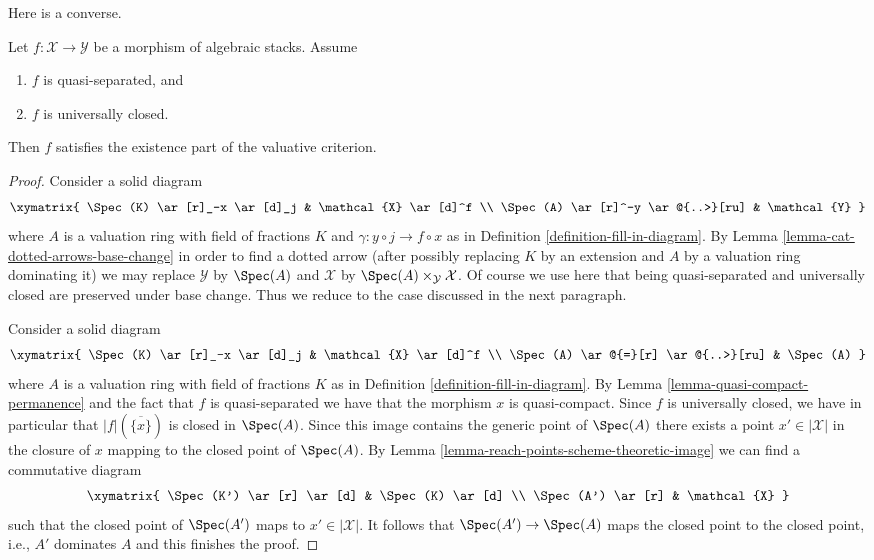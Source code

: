 \noindent
Here is a converse.

\begin{lemma}
\label{lemma-converse-existence-universally-closed}
Let $f : \mathcal{X} \to \mathcal{Y}$ be a morphism of algebraic stacks.
Assume
\begin{enumerate}
\item $f$ is quasi-separated, and
\item $f$ is universally closed.
\end{enumerate}
Then $f$ satisfies the existence part of the valuative criterion.
\end{lemma}

\begin{proof}
Consider a solid diagram
$$
\xymatrix{
\Spec(K) \ar[r]_-x \ar[d]_j & \mathcal{X} \ar[d]^f \\
\Spec(A) \ar[r]^-y \ar@{..>}[ru] & \mathcal{Y}
}
$$
where $A$ is a valuation ring with field of fractions $K$
and $\gamma : y \circ j \longrightarrow f \circ x$ as in
Definition \ref{definition-fill-in-diagram}. By
Lemma \ref{lemma-cat-dotted-arrows-base-change}
in order to find a dotted arrow (after possibly replacing
$K$ by an extension and $A$ by a valuation ring dominating it)
we may replace $\mathcal{Y}$ by $\Spec(A)$ and $\mathcal{X}$
by $\Spec(A) \times_\mathcal{Y} \mathcal{X}$. Of course
we use here that being
quasi-separated and universally closed are preserved under base change.
Thus we reduce to the case discussed in the next paragraph.

\medskip\noindent
Consider a solid diagram
$$
\xymatrix{
\Spec(K) \ar[r]_-x \ar[d]_j & \mathcal{X} \ar[d]^f \\
\Spec(A) \ar@{=}[r] \ar@{..>}[ru] & \Spec(A)
}
$$
where $A$ is a valuation ring with field of fractions $K$ as in
Definition \ref{definition-fill-in-diagram}.
By Lemma \ref{lemma-quasi-compact-permanence} and the fact
that $f$ is quasi-separated we have that
the morphism $x$ is quasi-compact.
Since $f$ is universally closed, we have in particular
that $|f|(\overline{\{x\}})$ is closed in $\Spec(A)$.
Since this image contains the generic point of $\Spec(A)$
there exists a point $x' \in |\mathcal{X}|$ in the closure
of $x$ mapping to the closed point of $\Spec(A)$.
By Lemma \ref{lemma-reach-points-scheme-theoretic-image}
we can find a commutative diagram
$$
\xymatrix{
\Spec(K') \ar[r] \ar[d] & \Spec(K) \ar[d] \\
\Spec(A') \ar[r] & \mathcal{X}
}
$$
such that the closed point of $\Spec(A')$ maps to $x' \in |\mathcal{X}|$.
It follows that $\Spec(A') \to \Spec(A)$ maps the closed point
to the closed point, i.e., $A'$ dominates $A$ and this finishes the proof.
\end{proof}





